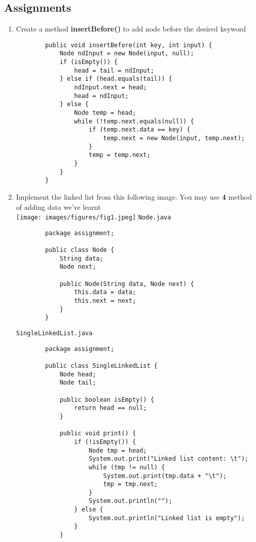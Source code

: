\documentclass[12pt,titlepage]{article}
\begin{document}
\subsection{Assignments}
\begin{enumerate}
    \item Create a method \textbf{insertBefore()} to add node before the desired keyword
    \begin{verbatim}
        public void insertBefore(int key, int input) {
            Node ndInput = new Node(input, null);
            if (isEmpty()) {
                head = tail = ndInput;
            } else if (head.equals(tail)) {
                ndInput.next = head;
                head = ndInput;
            } else {
                Node temp = head;
                while (!temp.next.equals(null)) {
                    if (temp.next.data == key) {
                        temp.next = new Node(input, temp.next);
                    }
                    temp = temp.next;
                }
            }
        }
    \end{verbatim}
    \item Implement the linked list from this following image. You may use \textbf{4} method of adding data we’ve learnt
    \hbox{}\\
    \texttt{[image: images/figures/fig1.jpeg]}
    \texttt{Node.java}
    \begin{verbatim}
        package assignment;

        public class Node {
            String data;
            Node next;

            public Node(String data, Node next) {
                this.data = data;
                this.next = next;
            }
        }
    \end{verbatim}
    \texttt{SingleLinkedList.java}
    \begin{verbatim}
        package assignment;

        public class SingleLinkedList {
            Node head;
            Node tail;

            public boolean isEmpty() {
                return head == null;
            }

            public void print() {
                if (!isEmpty()) {
                    Node tmp = head;
                    System.out.print("Linked list content: \t");
                    while (tmp != null) {
                        System.out.print(tmp.data + "\t");
                        tmp = tmp.next;
                    }
                    System.out.println("");
                } else {
                    System.out.println("Linked list is empty");
                }
            }


\end{verbatim}
\end{enumerate}
\end{document}
